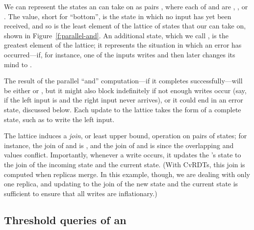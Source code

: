 
We can represent the
states an  can take on as pairs , where each of
 and  are , , or .  The 
value, short for ``bottom'', is the state in which no input has yet
been received, 
and so  is the least element of the lattice of
states that our  can take on, shown in Figure~\ref{f:parallel-and}.
An additional state, which we call ,
is the greatest element of the lattice; it
represents the situation in which an error has occurred---if, for
instance, one of the inputs writes  and then later changes its
mind to .

The result of the parallel ``and'' computation---if it completes
successfully---will be either  or , but it might also
block indefinitely if not enough writes occur (say, if the left input
is  and the right input never arrives), or it could end in
an error state, discussed below.
%
{Each update to the lattice takes the form of a complete state,
  such as  to write the left input.}

%
The lattice induces a \emph{join}, or least upper bound,
operation on 
pairs of states; for instance, the join of 
and  is , and the join of  and
 is  since the overlapping  and 
values conflict.
Importantly, whenever a write occurs, it updates the 's
state to the join of the incoming state and the current state.  (With
CvRDTs, this join is computed when replicas merge.  In this example,
though, we are dealing with only one replica, and updating to the join
of the new state and the current state is sufficient to ensure that
all writes are inflationary.)



\subsection{Threshold queries of an }

